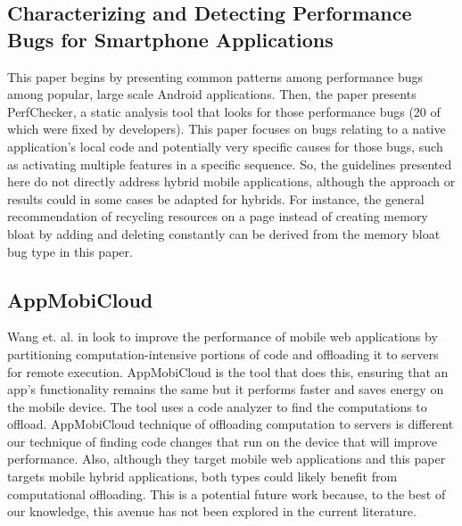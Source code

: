 \documentclass{acm_proc_article-sp}
\begin{document}
\subsection{Characterizing and Detecting Performance Bugs for Smartphone Applications \cite{liu2014characterizing} }
This paper begins by presenting common patterns among performance bugs among popular, large scale Android applications.
Then, the paper presents PerfChecker, a static analysis tool that looks for those performance bugs (20 of which were fixed by developers).
This paper focuses on bugs relating to a native application’s local code and potentially very specific causes for those bugs, such as activating multiple features in a specific sequence.
So, the guidelines presented here do not directly address hybrid mobile applications, although the approach or results could in some cases be adapted for hybrids.
For instance, the general recommendation of recycling resources on a page instead of creating memory bloat by adding and deleting constantly can be derived from the memory bloat bug type in this paper.

\subsection{AppMobiCloud \cite{Wang:2013:AIM:2532443.2532445}}
Wang et. al. in \cite{Wang:2013:AIM:2532443.2532445} look to improve the performance of mobile web applications by partitioning computation-intensive portions of code and offloading it to servers for remote execution. 
AppMobiCloud is the tool that does this, ensuring that an app's functionality remains the same but it performs faster and saves energy on the mobile device.
The tool uses a code analyzer to find the computations to offload. 
AppMobiCloud technique of offloading computation to servers is different our technique of finding code changes that run on the device that will improve performance.
Also, although they target mobile web applications and this paper targets mobile hybrid applications, both types could likely benefit from computational offloading.
This is a potential future work because, to the best of our knowledge, this avenue has not been explored in the current literature.
\end{document}
